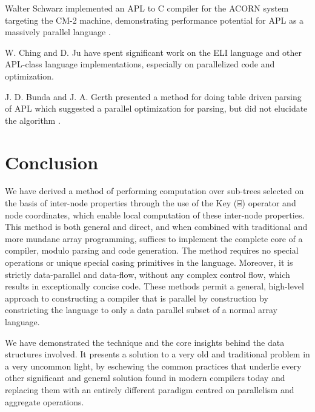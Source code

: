 \documentclass[numbers,preprint]{sigplanconf}
\begin{document}
Walter Schwarz implemented an APL to C compiler for the ACORN system
targeting the CM-2 machine, demonstrating performance potential for
APL as a massively parallel language \cite{schwarz1991acorn}.

W. Ching and D. Ju have spent significant work on the ELI language
and other APL-class language
 implementations, especially on parallelized code and optimization. 
\cite{ching2000design,ching1994experimental,ching1993primitive,
ching1990automatic,hendriks1990sparse,ju1991exploitation,
ju1991performance}

J. D. Bunda and J. A. Gerth presented a method for doing table driven
parsing of APL which suggested a parallel optimization for parsing,
but did not elucidate the algorithm \cite{bunda1984apl}.

\section{Conclusion}

We have derived a method of performing computation over sub-trees
selected on the basis of inter-node properties through the use of the
Key (⌸) operator and node coordinates, which enable local computation
of these inter-node properties. This method is both general and direct,
and when combined with traditional and more mundane array programming,
suffices to implement the complete core of a compiler, modulo parsing
and code generation. The method requires no special operations or
unique special casing primitives in the language. Moreover, it is
strictly data-parallel and data-flow, without any complex control flow,
which results in exceptionally concise code. These methods permit a 
general, high-level approach to constructing a compiler that is 
parallel by construction by constricting the language to only a data parallel 
subset of a normal array language. 

We have demonstrated the technique and the core insights behind the
data structures involved. It presents a solution to a very old and
traditional problem in a very uncommon light, by eschewing the common
practices that underlie every other significant and general solution
found in modern compilers today and replacing them with an entirely
different paradigm centred on parallelism and aggregate operations.



\end{document}
